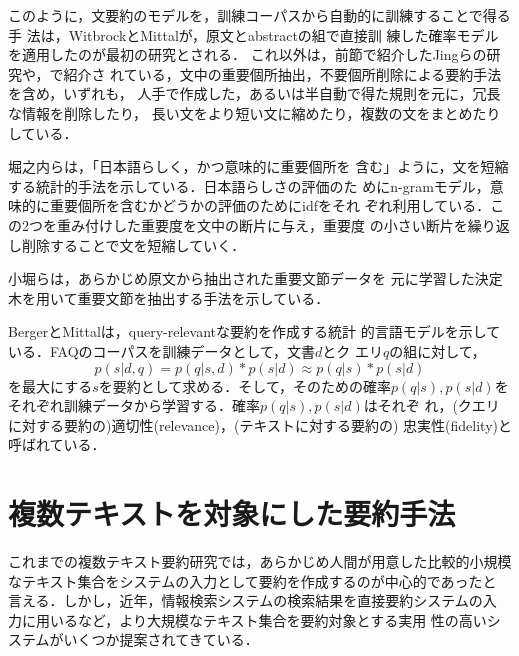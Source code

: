 このように，文要約のモデルを，訓練コーパスから自動的に訓練することで得る手
法は，WitbrockとMittal\cite{witbrock:99:a}が，原文とabstractの組で直接訓
練した確率モデルを適用したのが最初の研究とされる．
これ以外は，前節で紹介したJingらの研究や，\cite{okumura:99:a}で紹介さ
れている，文中の重要個所抽出，不要個所削除による要約手法を含め，いずれも，
人手で作成した，あるいは半自動で得た規則を元に，冗長な情報を削除したり，
長い文をより短い文に縮めたり，複数の文をまとめたりしている．

堀之内ら\cite{horinouchi:00:a}は，「日本語らしく，かつ意味的に重要個所を
含む」ように，文を短縮する統計的手法を示している．日本語らしさの評価のた
めにn-gramモデル，意味的に重要個所を含むかどうかの評価のためにidfをそれ
ぞれ利用している．この2つを重み付けした重要度を文中の断片に与え，重要度
の小さい断片を繰り返し削除することで文を短縮していく．

小堀ら\cite{kobori:00:a}は，あらかじめ原文から抽出された重要文節データを
元に学習した決定木を用いて重要文節を抽出する手法を示している．

BergerとMittal\cite{berger:00:b}は，query-relevantな要約を作成する統計
的言語モデルを示している．FAQのコーパスを訓練データとして，文書$d$とク
エリ$q$の組に対して，
\[ p(s|d,q) = p(q|s,d)*p(s|d) \approx p(q|s)*p(s|d) \]
を最大にする$s$を要約として求める．そして，そのための確率$p(q|s),
p(s|d)$をそれぞれ訓練データから学習する．確率$p(q|s), p(s|d)$はそれぞ
れ，(クエリに対する要約の)適切性(relevance)，(テキストに対する要約の)
忠実性(fidelity)と呼ばれている．
\

\section{複数テキストを対象にした要約手法}

これまでの複数テキスト要約研究では，あらかじめ人間が用意した比較的小規模
なテキスト集合をシステムの入力として要約を作成するのが中心的であったと
言える．しかし，近年，情報検索システムの検索結果を直接要約システムの入
力に用いるなど，より大規模なテキスト集合を要約対象とする実用
性の高いシステムがいくつか提案されてきている．

